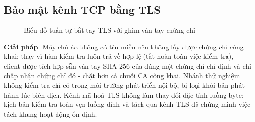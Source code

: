 \subsection{Bảo mật kênh TCP bằng TLS}
\begin{figure}[H]
\centering
\renewcommand{\seqstep}{0.64cm}
\caption{Biểu đồ tuần tự bắt tay TLS với ghim vân tay chứng chỉ}
\label{fig:D-luong-tls}
\end{figure}
\textbf{Giải pháp.} Máy chủ ảo không có tên miền nên không lấy được chứng chỉ công khai; thay vì hàm kiểm tra luôn trả
về hợp lệ (tắt hoàn toàn việc kiểm tra), client được tích hợp sẵn vân tay SHA-256 của đúng một chứng chỉ chỉ định và chỉ chấp nhận
chứng chỉ đó - chặt hơn cả chuỗi CA công khai. Nhánh thử nghiệm không kiểm tra chỉ có trong môi trường phát triển nội bộ, bị loại khỏi bản
phát hành lúc biên dịch. Kênh mã hoá TLS không làm thay đổi đặc tính luồng byte: kịch bản kiểm tra toàn vẹn luồng dính và tách qua kênh TLS đã chứng minh việc tách khung hoạt động ổn định.

